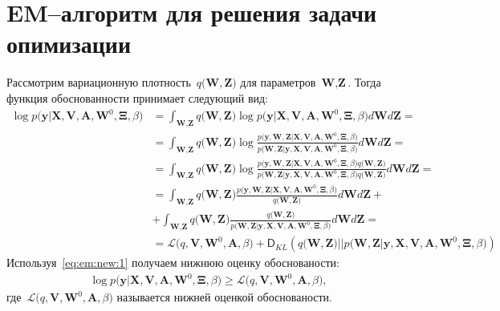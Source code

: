 \documentclass[12pt, twoside]{article}
\numberwithin{equation}{section}
\begin{document}
\section{EM--алгоритм для решения задачи опимизации}
Рассмотрим вариационную плотность~$q\bigr(\textbf{W}, \textbf{Z}\bigr)$ для параметров~$\textbf{W}, \textbf{Z}$. Тогда функция обоснованности принимает следующий вид:
\[
\label{eq:em:new:1}
\begin{aligned}
\log p\bigr(\mathbf{y}|\mathbf{X}, \mathbf{V}, \textbf{A}, \textbf{W}^{0}, \bm{\Xi}, \beta\bigr) &= \int_{\textbf{W}, \textbf{Z}} q\bigr(\textbf{W}, \textbf{Z}\bigr) \log p\bigr(\mathbf{y}|\mathbf{X}, \mathbf{V}, \textbf{A}, \textbf{W}^{0}, \bm{\Xi}, \beta\bigr)d\textbf{W}d\textbf{Z} =\\
&= \int_{\textbf{W}, \textbf{Z}} q\bigr(\textbf{W}, \textbf{Z}\bigr)\log \frac{p\bigr(\mathbf{y}, \textbf{W}, \textbf{Z}|\mathbf{X}, \mathbf{V}, \textbf{A}, \textbf{W}^{0}, \bm{\Xi}, \beta\bigr)}{p\bigr(\textbf{W}, \textbf{Z}|\mathbf{y}, \mathbf{X}, \mathbf{V}, \textbf{A}, \textbf{W}^{0}, \bm{\Xi}, \beta\bigr)}d\textbf{W}d\textbf{Z}=\\
&= \int_{\textbf{W}, \textbf{Z}} q\bigr(\textbf{W}, \textbf{Z}\bigr)\log \frac{p\bigr(\mathbf{y}, \textbf{W}, \textbf{Z}|\mathbf{X}, \mathbf{V}, \textbf{A}, \textbf{W}^{0}, \bm{\Xi}, \beta\bigr)q\bigr(\textbf{W}, \textbf{Z}\bigr)}{p\bigr(\textbf{W}, \textbf{Z}|\mathbf{y}, \mathbf{X}, \mathbf{V}, \textbf{A}, \textbf{W}^{0}, \bm{\Xi}, \beta\bigr)q\bigr(\textbf{W}, \textbf{Z}\bigr)}d\textbf{W}d\textbf{Z}=\\
&= \int_{\textbf{W}, \textbf{Z}} q\bigr(\textbf{W}, \textbf{Z}\bigr)\frac{p\bigr(\mathbf{y}, \textbf{W}, \textbf{Z}|\mathbf{X}, \mathbf{V}, \textbf{A}, \textbf{W}^{0}, \bm{\Xi}, \beta\bigr)}{q\bigr(\textbf{W}, \textbf{Z}\bigr)}d\textbf{W}d\textbf{Z}+\\
&+\int_{\textbf{W}, \textbf{Z}} q\bigr(\textbf{W}, \textbf{Z}\bigr)\frac{q\bigr(\textbf{W}, \textbf{Z}\bigr)}{p\bigr(\textbf{W}, \textbf{Z}|\mathbf{y}, \mathbf{X}, \mathbf{V}, \textbf{A}, \textbf{W}^{0}, \bm{\Xi}, \beta\bigr)}d\textbf{W}d\textbf{Z}=\\
&=\mathcal{L}\bigr(q, \textbf{V}, \textbf{W}^{0}, \textbf{A}, \beta\bigr)+\mathsf{D}_{KL}\left(q\bigr(\textbf{W}, \textbf{Z}\bigr)||p\bigr(\textbf{W}, \textbf{Z}|\mathbf{y}, \mathbf{X}, \mathbf{V}, \textbf{A}, \textbf{W}^{0}, \bm{\Xi}, \beta\bigr)\right)
\end{aligned}
\]
Используя~\eqref{eq:em:new:1} получаем нижнюю оценку обоснованости:
\[
\label{eq:em:new:2}
\begin{aligned}
\log p\bigr(\mathbf{y}|\mathbf{X}, \mathbf{V}, \textbf{A}, \textbf{W}^{0}, \bm{\Xi}, \beta\bigr)\geq \mathcal{L}\bigr(q, \textbf{V}, \textbf{W}^{0}, \textbf{A}, \beta\bigr),
\end{aligned}
\]
где~$\mathcal{L}\bigr(q, \textbf{V}, \textbf{W}^{0}, \textbf{A}, \beta\bigr)$ называется нижней оценкой обоснованости.
\end{document}
